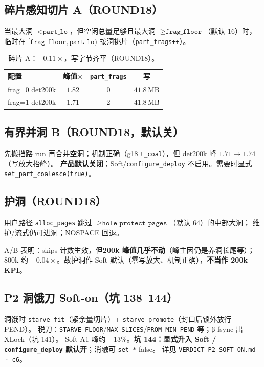 \subsection{碎片感知切片 A（ROUND18）}
当最大洞 $< \texttt{part\_lo}$，但空闲总量足够且最大洞 $\ge \texttt{frag\_floor}$（默认 16）时，
临时在 $[\texttt{frag\_floor},\texttt{part\_lo})$ 按洞挑片（\texttt{part\_frags++}）。

\begin{table}[ht]
\centering
\small
\begin{tabular}{@{}lccc@{}}
\toprule
配置 & 峰值$\times$ & \texttt{part\_frags} & 写 \\
\midrule
frag=0 det200k & $1.82$ & 0 & $41.8\,\mathrm{MB}$ \\
frag=1 det200k & $\mathbf{1.71}$ & 2 & $41.8\,\mathrm{MB}$ \\
\bottomrule
\end{tabular}
\caption{碎片 A：$-0.11\times$，写字节齐平（ROUND18）。}
\end{table}

\subsection{有界并洞 B（ROUND18，默认关）}
先搬挡路 run 再合并空洞；机制正确（g18 \texttt{t\_coal}），但 det200k 峰 $1.71\to1.74$（写放大抬峰）。
\textbf{产品默认关闭}；Soft/\texttt{configure\_deploy} 不启用。需要时显式 \texttt{set\_part\_coalesce(true)}。

\subsection{护洞（ROUND18）}
用户路径 \texttt{alloc\_pages} 跳过 $\ge\texttt{hole\_protect\_pages}$（默认 64）的中部大洞；
维护/流式仍可进洞；NOSPACE 回退。

A/B 表明：skips 计数生效，但\textbf{200k 峰值几乎不动}（峰主因仍是养洞长尾等）；
800k 约 $-0.04\times$。故护洞作 Soft 默认（零写放大、机制正确），\textbf{不当作 200k KPI}。

\subsection{P2 洞饿刀 Soft-on（坑 138--144）}
洞饿时 \texttt{starve\_fit}（紧余量切片）+ \texttt{starve\_promote}（封口后锁外放行 PEND）。
税刀：\texttt{STARVE\_FLOOR}/\texttt{MAX\_SLICES}/\texttt{PROM\_MIN\_PEND} 等；β fsync 出 XLock（坑 141）。
Soft A1 峰约 $-13\%$。\textbf{坑 144：显式升入 Soft / \texttt{configure\_deploy} 默认开}；消融可 \texttt{set\_*} false。
详见 \texttt{VERDICT\_P2\_SOFT\_ON.md} · \texttt{c6}。
